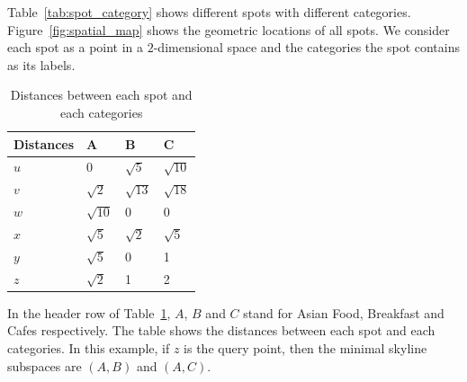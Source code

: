 Table~\ref{tab:spot_category} shows different spots with different categories. Figure~\ref{fig:spatial_map} shows the geometric locations of all spots. We consider each spot as a point in a $2$-dimensional space and the categories the spot contains as its labels.

\begin{table}[h]
    \centering
    \begin{tabular}{llll}
    \hline
    Distances & A & B & C \\ \hline
    $u$       & 0 & $\sqrt{5}$ & $\sqrt{10}$ \\ \hline
    $v$       & $\sqrt{2}$ & $\sqrt{13}$ & $\sqrt{18}$ \\ \hline
    $w$       & $\sqrt{10}$ & 0 & 0 \\ \hline
    $x$       & $\sqrt{5}$ & $\sqrt{2}$ & $\sqrt{5}$ \\ \hline
    $y$       & $\sqrt{5}$ & 0 & 1 \\ \hline
    $z$       & $\sqrt{2}$ & 1 & 2 \\ \hline
    \end{tabular}
    \caption{\label{tab:distances_spatial} Distances between each spot and each categories}
\end{table}

In the header row of Table~\ref{tab:distances_spatial}, $A$, $B$ and $C$ stand for Asian Food, Breakfast and Cafes respectively. The table shows the distances between each spot and each categories. In this example, if $z$ is the query point, then the minimal skyline subspaces are $(A, B)$ and $(A, C)$.


